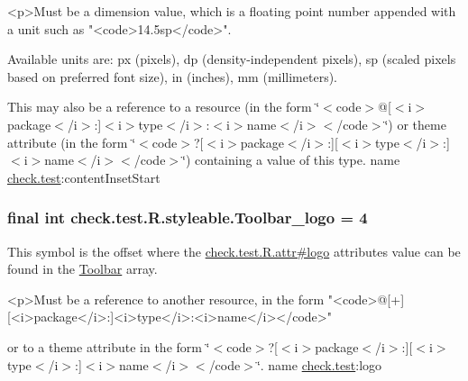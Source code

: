 \begin{DoxyVerb}      <p>Must be a dimension value, which is a floating point number appended with a unit such as "<code>14.5sp</code>".
\end{DoxyVerb}
 Available units are\+: px (pixels), dp (density-\/independent pixels), sp (scaled pixels based on preferred font size), in (inches), mm (millimeters). 

This may also be a reference to a resource (in the form \char`\"{}$<$code$>$@\mbox{[}$<$i$>$package$<$/i$>$\+:\mbox{]}$<$i$>$type$<$/i$>$\+:$<$i$>$name$<$/i$>$$<$/code$>$\char`\"{}) or theme attribute (in the form \char`\"{}$<$code$>$?\mbox{[}$<$i$>$package$<$/i$>$\+:\mbox{]}\mbox{[}$<$i$>$type$<$/i$>$\+:\mbox{]}$<$i$>$name$<$/i$>$$<$/code$>$\char`\"{}) containing a value of this type.  name \hyperlink{namespacecheck_1_1test}{check.\+test}\+:content\+Inset\+Start \hypertarget{classcheck_1_1test_1_1_r_1_1styleable_a42f433954d5c39edb50f485b83d4bfbd}{}
\subsubsection[{Toolbar\+\_\+logo}]{\setlength{\rightskip}{0pt plus 5cm}final int check.\+test.\+R.\+styleable.\+Toolbar\+\_\+logo = 4\hspace{0.3cm}{\ttfamily [static]}}\label{classcheck_1_1test_1_1_r_1_1styleable_a42f433954d5c39edb50f485b83d4bfbd}
This symbol is the offset where the \hyperlink{classcheck_1_1test_1_1_r_1_1attr_a88dc33a575e7d1ce7a25603825bb87c0}{check.\+test.\+R.\+attr\#logo} attribute\textquotesingle{}s value can be found in the \hyperlink{classcheck_1_1test_1_1_r_1_1styleable_a1a7fa90223693abef77e7484cca2df54}{Toolbar} array.

\begin{DoxyVerb}      <p>Must be a reference to another resource, in the form "<code>@[+][<i>package</i>:]<i>type</i>:<i>name</i></code>"
\end{DoxyVerb}
 or to a theme attribute in the form \char`\"{}$<$code$>$?\mbox{[}$<$i$>$package$<$/i$>$\+:\mbox{]}\mbox{[}$<$i$>$type$<$/i$>$\+:\mbox{]}$<$i$>$name$<$/i$>$$<$/code$>$\char`\"{}.  name \hyperlink{namespacecheck_1_1test}{check.\+test}\+:logo \hypertarget{classcheck_1_1test_1_1_r_1_1styleable_aa33122c1e3e1e09c60ff7a33506a08d8}{}
